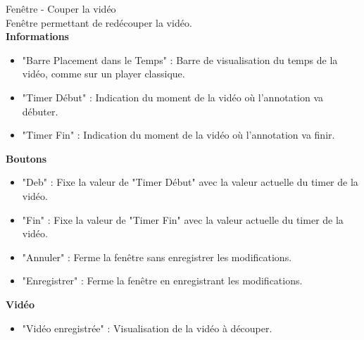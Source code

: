 \documentclass[11pt,french,a4paper]{report}
\begin{document}
\begin{multicols}{2}
\begin{small}
\Large Fenêtre - Couper la vidéo\normalsize \\
    Fenêtre permettant de redécouper la vidéo. \\
\large \textbf{Informations}\normalsize
    \begin{itemize}[label=, leftmargin=*,parsep=0cm,itemsep=0cm,topsep=0cm]
        \item "Barre Placement dans le Temps" : Barre de visualisation du temps de la vidéo, comme sur un player classique.
        \item "Timer Début" : Indication du moment de la vidéo où l'annotation va débuter.
        \item "Timer Fin" : Indication du moment de la vidéo où l'annotation va finir.
    \end{itemize}
\large \textbf{Boutons}\normalsize
    \begin{itemize}[label=, leftmargin=*,parsep=0cm,itemsep=0cm,topsep=0cm]
        \item "Deb" : Fixe la valeur de "Timer Début" avec la valeur actuelle du timer de la vidéo.
        \item "Fin" : Fixe la valeur de "Timer Fin" avec la valeur actuelle du timer de la vidéo.
        \item "Annuler" : Ferme la fenêtre sans enregistrer les modifications.
        \item "Enregistrer" : Ferme la fenêtre en enregistrant les modifications.
    \end{itemize}
\large \textbf{Vidéo}\normalsize
    \begin{itemize}[label=, leftmargin=*,parsep=0cm,itemsep=0cm,topsep=0cm]
        \item "Vidéo enregistrée" : Visualisation de la vidéo à découper.
    \end{itemize}


\dotfill \\


\end{small}
\end{multicols}
\end{document}
